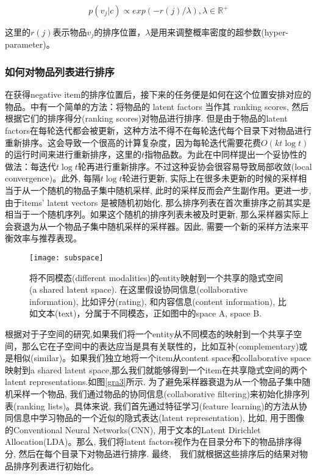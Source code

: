 \begin{equation}
p\left(v_j|c\right) \propto exp\left(-r\left(j\right)/\lambda\right),\lambda \in \mathbb{R}^+
\end{equation}

这里的$r\left(j\right)$表示物品$v_j$的排序位置，$\lambda$是用来调整概率密度的超参数(hyper-parameter)。




\subsubsection{如何对物品列表进行排序}
在获得negative item的排序位置后，接下来的任务便是如何在这个位置安排对应的物品。\cite{rendle2014improving}中有一个简单的方法：将物品的 latent factors 当作其 ranking scores, 然后根据它们的排序得分(ranking scores)对物品进行排序. 但是由于物品的latent factors在每轮迭代都会被更新，这种方法不得不在每轮迭代每个目录下对物品进行重新排序。这会导致一个很高的计算复杂度，因为每轮迭代需要花费$\mathit{O}\left(kt\log t\right)$的运行时间来进行重新排序，这里的$t$指物品数。为此在\cite{rendle2014improving}中同样提出一个妥协性的做法：每迭代$t \log t$轮再进行重新排序。不过这种妥协会很容易导致局部收敛(local convergence)。此外, 每隔$t\log t$轮进行更新, 实际上在很多未更新的时候的采样相当于从一个随机的物品子集中随机采样, 此时的采样反而会产生副作用。更进一步, 由于items' latent vectors 是被随机初始化, 那么排序列表在首次重排序之前其实是相当于一个随机序列。如果这个随机的排序列表未被及时更新, 那么采样器实际上会衰退为从一个物品子集中随机采样的采样器。因此, 需要一个新的采样方法来平衡效率与推荐表现。

\begin{figure}[htbp]
	\begin{center}
		\texttt{[image: subspace]}
		\caption{将不同模态(different modalities)的entity映射到一个共享的隐式空间(a shared latent space). 在这里假设协同信息(collaborative information), 比如评分(rating), 和内容信息(content information), 比如文本(text)，分属于不同模态，正如图中的space A, space B.}
		\label{gra5}
	\end{center}
\end{figure}

根据对于子空间的研究\cite{udupa2010improving,rasiwasia2010new},如果我们将一个entity从不同模态的映射到一个共享子空间，那么它在子空间中的表达应当是具有关联性的，比如互补(complementary)或是相似(similar)。如果我们独立地将一个item从content space和collaborative space映射到a shared latent space,那么我们就能够得到一个item在共享隐式空间的两个latent representations.如图\ref{gra3}所示. 为了避免采样器衰退为从一个物品子集中随机采样一个物品, 我们通过物品的协同信息(collaborative filtering)来初始化排序列表(ranking lists)。具体来说, 我们首先通过特征学习(feature learning)的方法从协同信息中学习物品的一个近似的隐式表达(latent representation), 比如, 用于图像的Conventional Neural Networks(CNN), 用于文本的Latent Dirichlet Allocation(LDA)。那么, 我们将latent factors视作为在目录分布下的物品排序得分, 然后在每个目录下对物品进行排序. 最终,　我们就根据这些排序后的结果对物品排序列表进行初始化。

